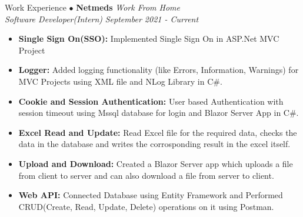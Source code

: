 \begin{rSection}{Work Experience}
    $\bullet$ \textbf{Netmeds} \hfill {\em Work From Home}\\
    {\em Software Developer(Intern)} \hfill{\em September 2021 - Current}\\
    \begin{itemize}
        \item \textbf{Single Sign On(SSO):} Implemented Single Sign On in ASP.Net MVC Project
        \item \textbf{Logger:} Added logging functionality (like Errors, Information, Warnings) for MVC Projects using XML file and NLog Library in C\#.
        \item \textbf{Cookie and Session Authentication:} User based Authentication with session timeout using Mssql database for login and Blazor Server App in C\#.
        \item \textbf{Excel Read and Update:} Read Excel file for the required data, checks the data in the database and writes the corrosponding result in the excel itself.
        \item \textbf{Upload and Download:} Created a Blazor Server app which uploads a file from client to server and can also download a file from server to client.
        \item \textbf{Web API:} Connected Database using Entity Framework and Performed CRUD(Create, Read, Update, Delete) operations on it using Postman.
    \end{itemize}
\end{rSection}